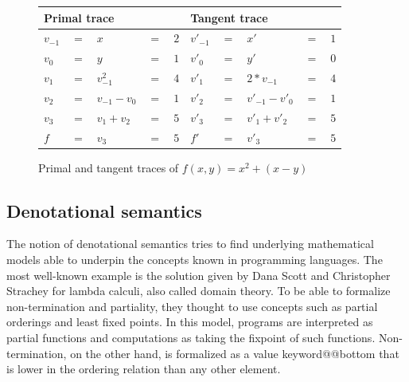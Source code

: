 \documentclass[12pt, final]{article}
\makeatletter
\def\<#1>{\csname keyword@@#1\endcsname}
\makeatother
\begin{document}
\begin{figure}[h]
  \begin{center}
    \begin{tabular}{ l l l l l | l l l l l }
      \hline
      \multicolumn{5}{l}{Primal trace} & \multicolumn{5}{l}{Tangent trace} \\
      \hline
$v_{-1} $&$=$&$x$&$=$&$2$             &$v'_{-1}$&$=$&$x'$&$=$&$1$ \\
$v_0    $&$=$&$y$&$=$&$1$             &$v'_{0}$&$=$&$y'$&$=$&$0$ \\
      \hline
$v_1    $&$=$&$v_{-1}^2$&$=$&$4$      &$v'_{1}$&$=$&$2*v_{-1}$&$=$&$4$ \\
$v_2    $&$=$&$v_{-1} - v_{0}$&$=$&$1$&$v'_{2}$&$=$&$v'_{-1}-v'_{0}$&$=$&$1$ \\
$v_3    $&$=$&$v_1 + v_2$&$=$&$5$     &$v'_{3}$&$=$&$v'_1 + v'_2$&$=$&$5$ \\
      \hline
$f      $&$=$&$v_3$&$=$&$5$           &$f'$&$=$&$v'_3$&$=$&$5$ \\
      \hline
    \end{tabular}
  \end{center}
  \caption{Primal and tangent traces of $f(x, y) = x^2 + (x - y)$}
  \label{table:func_trace}
\end{figure}


\subsection{Denotational semantics}

The notion of denotational semantics tries to find underlying mathematical models able to underpin the concepts known in programming languages. The most well-known example is the solution given by Dana Scott and Christopher Strachey\cite{Scott1977} for lambda calculi, also called domain theory.
To be able to formalize non-termination and partiality, they thought to use concepts such as partial orderings and least fixed points\cite{aaby2020}.
In this model, programs are interpreted as partial functions and computations as taking the fixpoint of such functions.
Non-termination, on the other hand, is formalized as a value \<bottom> that is lower in the ordering relation than any other element.
\end{document}
